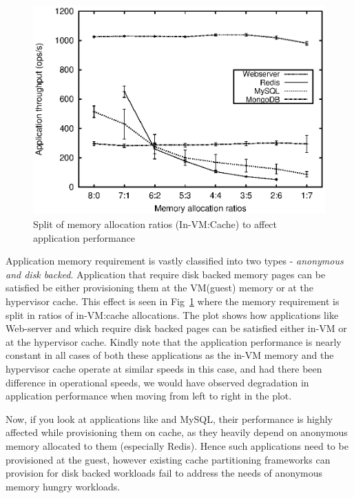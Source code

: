 	\begin{figure}
	  \centering
	  \includegraphics[scale=0.8]{images/dd_decentrailze_motivation/throughput.eps}
	  \caption{Split of memory allocation ratios (In-VM:Cache) to affect application performance}
	  \label{plot:dd_decentrailze_motivation}
	\end{figure}
	
	Application memory requirement is vastly classified into two types - \textit{anonymous and disk backed}.
	Application that require disk backed memory pages can be satisfied be either provisioning them at the 
	VM(guest) memory or at the hypervisor cache. This effect is seen in Fig~\ref{plot:dd_decentrailze_motivation}
	where the memory requirement is split in ratios of in-VM:cache allocations. The plot shows how applications like
	Web-server and \mongo{} which require disk backed pages can be satisfied either in-VM or at the hypervisor cache.
	Kindly note that the application performance is nearly constant in all cases of both these applications as the 
	in-VM memory and the hypervisor cache operate at similar speeds in this case, and had there been difference in
	operational speeds, we would have observed degradation in application performance when moving from left to right 
	in the plot.
	
	Now, if you look at applications like \redis{} and MySQL, their performance is highly affected while provisioning
	them on cache, as they heavily depend on anonymous memory allocated to them (especially Redis). Hence such applications
	need to be provisioned at the guest, however existing cache partitioning frameworks 
	\cite{koller2015centaur, schopp2006resizing} can provision for disk backed workloads fail to address the needs of 
	anonymous memory hungry workloads.
          

